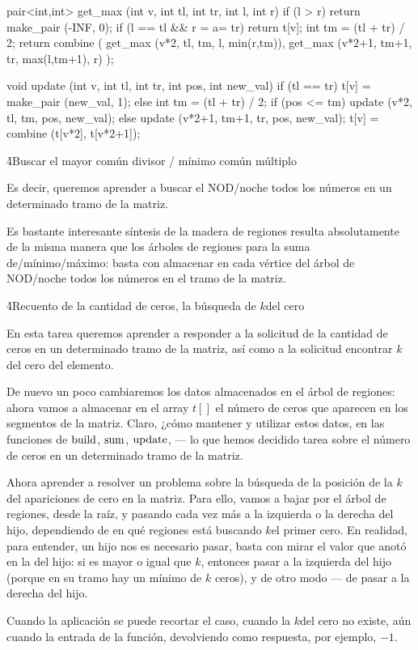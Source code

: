 pair<int,int> get_max (int v, int tl, int tr, int l, int r) {
if (l > r)
return make_pair (-INF, 0);
if (l == tl && r = a= tr)
return t[v];
int tm = (tl + tr) / 2;
return combine (
get_max (v*2, tl, tm, l, min(r,tm)),
get_max (v*2+1, tm+1, tr, max(l,tm+1), r)
);
}

void update (int v, int tl, int tr, int pos, int new_val) {
if (tl == tr)
t[v] = make_pair (new_val, 1);
else {
int tm = (tl + tr) / 2;
if (pos <= tm)
 update (v*2, tl, tm, pos, new_val);
else
update (v*2+1, tm+1, tr, pos, new_val);
t[v] = combine (t[v*2], t[v*2+1]);
}
}
\endcode

\h4{Buscar el mayor común divisor / mínimo común múltiplo}

Es decir, queremos aprender a buscar el NOD/noche todos los números en un determinado tramo de la matriz.

Es bastante interesante síntesis de la madera de regiones resulta absolutamente de la misma manera que los árboles de regiones para la suma de/mínimo/máximo: basta con almacenar en cada vértice del árbol de NOD/noche todos los números en el tramo de la matriz.

\h4{Recuento de la cantidad de ceros, la búsqueda de $k$del cero}

En esta tarea queremos aprender a responder a la solicitud de la cantidad de ceros en un determinado tramo de la matriz, así como a la solicitud encontrar $k$del cero del elemento.

De nuevo un poco cambiaremos los datos almacenados en el árbol de regiones: ahora vamos a almacenar en el array $t[]$ el número de ceros que aparecen en los segmentos de la matriz. Claro, ¿cómo mantener y utilizar estos datos, en las funciones de $\rm build$, $\rm sum$, $\rm update$, --- lo que hemos decidido tarea sobre el número de ceros en un determinado tramo de la matriz.

Ahora aprender a resolver un problema sobre la búsqueda de la posición de la $k$del apariciones de cero en la matriz. Para ello, vamos a bajar por el árbol de regiones, desde la raíz, y pasando cada vez más a la izquierda o la derecha del hijo, dependiendo de en qué regiones está buscando $k$el primer cero. En realidad, para entender, un hijo nos es necesario pasar, basta con mirar el valor que anotó en la del hijo: si es mayor o igual que $k$, entonces pasar a la izquierda del hijo (porque en su tramo hay un mínimo de $k$ ceros), y de otro modo --- de pasar a la derecha del hijo.

Cuando la aplicación se puede recortar el caso, cuando la $k$del cero no existe, aún cuando la entrada de la función, devolviendo como respuesta, por ejemplo, $-1$.

